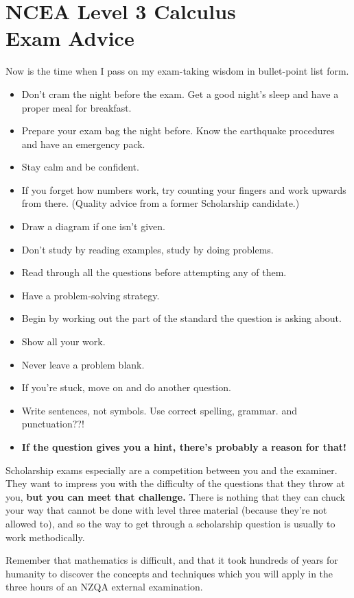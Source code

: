 \documentclass{exam}
\theoremstyle{definition}
\begin{document}
\section*{NCEA Level 3 Calculus\\Exam Advice}

Now is the time when I pass on my exam-taking wisdom in bullet-point list form.

\begin{itemize}
  \item Don't cram the night before the exam. Get a good night's sleep and have a proper meal for breakfast.
  \item Prepare your exam bag the night before. Know the earthquake procedures and have an emergency pack.
  \item Stay calm and be confident.
  \item If you forget how numbers work, try counting your fingers and work upwards from there. (Quality advice from a former Scholarship candidate.)
  \item Draw a diagram if one isn't given.
  \item Don't study by reading examples, study by doing problems.
  \item Read through all the questions before attempting any of them.
  \item Have a problem-solving strategy.
  \item Begin by working out the part of the standard the question is asking about.
  \item Show all your work.
  \item Never leave a problem blank.
  \item If you're stuck, move on and do another question.
  \item Write sentences, not symbols. Use correct spelling, grammar. and punctuation??!
  \item \textbf{If the question gives you a hint, there's probably a reason for that!}
\end{itemize}

Scholarship exams especially are a competition between you and the examiner. They want to impress you with the difficulty of the
questions that they throw at you, \textbf{but you can meet that challenge.} There is nothing that they can chuck your way that cannot
be done with level three material (because they're not allowed to), and so the way to get through a scholarship question is usually
to work methodically.

Remember that mathematics is difficult, and that it took hundreds of years for humanity to discover the concepts and techniques
which you will apply in the three hours of an NZQA external examination.
\end{document}
